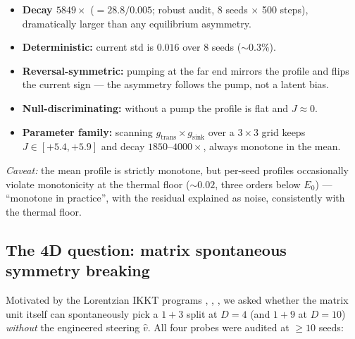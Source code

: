 \documentclass[12pt,a4paper]{article}
\providecommand{\tightlist}{%
  \setlength{\itemsep}{0pt}\setlength{\parskip}{0pt}}
\begin{document}
\begin{itemize}
\tightlist
\item
  \textbf{Decay \(5849\times\)} (\(=28.8/0.005\); robust audit, 8 seeds
  \(\times\) 500 steps), dramatically larger than any equilibrium
  asymmetry.
\item
  \textbf{Deterministic:} current std is \(0.016\) over 8 seeds
  (\(\sim0.3\%\)).
\item
  \textbf{Reversal-symmetric:} pumping at the far end mirrors the
  profile and flips the current sign --- the asymmetry follows the pump,
  not a latent bias.
\item
  \textbf{Null-discriminating:} without a pump the profile is flat and
  \(J\approx0\).
\item
  \textbf{Parameter family:} scanning
  \(g_{\mathrm{trans}}\times g_{\mathrm{sink}}\) over a \(3\times3\)
  grid keeps \(J\in[+5.4,+5.9]\) and decay \(1850\)--\(4000\times\),
  always monotone in the mean.
\end{itemize}

\emph{Caveat:} the mean profile is strictly monotone, but per-seed
profiles occasionally violate monotonicity at the thermal floor
(\(\sim0.02\), three orders below \(E_0\)) --- ``monotone in practice'',
with the residual explained as noise, consistently with the thermal
floor.

\subsection{The 4D question: matrix spontaneous symmetry
breaking}\label{the-4d-question-matrix-spontaneous-symmetry-breaking}

Motivated by the Lorentzian IKKT programs \cite{kim_nishimura_2011},
\cite{kim_nishimura_2012}, \cite{ishibashi_kawai_kitazawa_tsuchiya_1997}, we asked whether the
matrix unit itself can spontaneously pick a \(1{+}3\) split at \(D=4\)
(and \(1{+}9\) at \(D=10\)) \emph{without} the engineered steering
\(\hat v\). All four probes were audited at \(\ge 10\) seeds:
\end{document}
